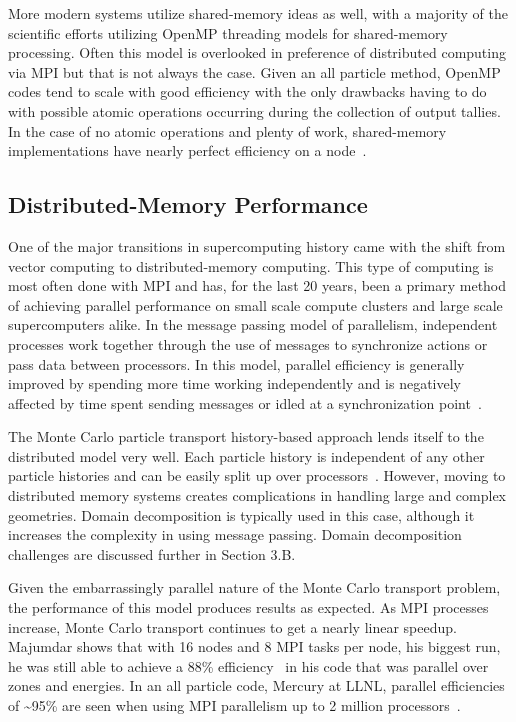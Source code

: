 More modern systems utilize shared-memory ideas as well, with a majority of the scientific efforts utilizing OpenMP threading models for shared-memory processing.
%
Often this model is overlooked in preference of distributed computing via MPI but that is not always the case.
%
Given an all particle method, OpenMP codes tend to scale with good efficiency with the only drawbacks having to do with possible atomic operations occurring during the collection of output tallies.
%
In the case of no atomic operations and plenty of work, shared-memory implementations have nearly perfect efficiency on a node~\cite{siegel2014multi}.

\subsection*{ \textbf{Distributed-Memory Performance}}

One of the major transitions in supercomputing history came with the shift from vector computing to distributed-memory computing.
%
This type of computing is most often done with MPI and has, for the last 20 years, been a primary method of achieving parallel performance on small scale compute clusters and large scale supercomputers alike.
%
In the message passing model of parallelism, independent processes work together through the use of messages to synchronize actions or pass data between processors.
%
In this model, parallel efficiency is generally improved by spending more time working independently and is negatively affected by time spent sending messages or idled at a synchronization point~\cite{yanghybrid}.
%

%
The Monte Carlo particle transport history-based approach lends itself to the distributed model very well.
%
Each particle history is independent of any other particle histories and can be easily split up over processors~\cite{yanghybrid}.
%
However, moving to distributed memory systems creates complications in handling large and complex geometries.
%
Domain decomposition is typically used in this case, although it increases the complexity in using message passing.
%
Domain decomposition challenges are discussed further in Section 3.B.
%

%
Given the embarrassingly parallel nature of the Monte Carlo transport problem, the performance of this model produces results as expected.
%
As MPI processes increase, Monte Carlo transport continues to get a nearly linear speedup.
%
Majumdar shows that with 16 nodes and 8 MPI tasks per node, his biggest run, he was still able to achieve a 88\% efficiency~\cite{majumdar2000parallel} in his code that was parallel over zones and energies.
%
In an all particle code, Mercury at LLNL, parallel efficiencies of \textasciitilde95\% are seen when using MPI parallelism up to 2 million processors~\cite{o2013scalable}.

